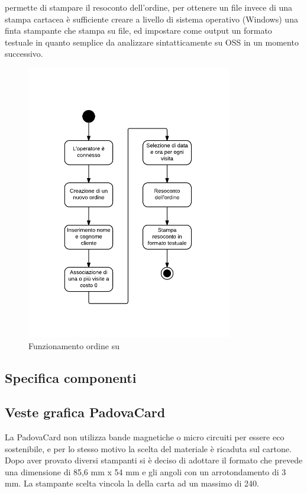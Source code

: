 \tlite permette di stampare il resoconto dell'ordine, per ottenere un file invece di una stampa cartacea è sufficiente creare a livello di sistema operativo (Windows) una finta stampante che stampa su file, ed impostare come output un formato testuale in quanto semplice da analizzare sintatticamente su OSS in un momento successivo.

\begin{figure}[H]
\centering
\includegraphics[width=0.8\textwidth]{images/tlite.png}
\caption{Funzionamento ordine su \tlite \label{tlite}}
\end{figure}

\subsection{Specifica componenti}\label{specificacomponenti}



\subsection{Veste grafica PadovaCard}

La PadovaCard non utilizza bande magnetiche o micro circuiti per essere eco sostenibile, e per lo stesso motivo la scelta del materiale è ricaduta sul cartone. 
Dopo aver provato diversi stampanti si è deciso di adottare il formato  che prevede una dimensione di 85,6 mm x 54 mm e gli angoli con un arrotondamento di 3 mm. La stampante scelta vincola la  della carta ad un massimo di 240. \\

